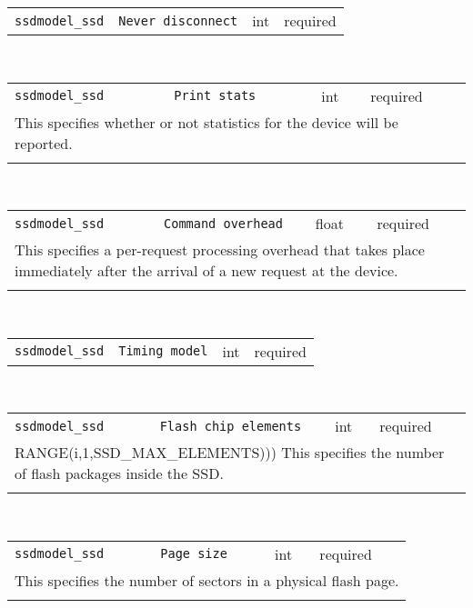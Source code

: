 \noindent 
\begin{tabular}{|p{\lpmodwidth}|p{\lpnamewidth}|p{0.5in}|p{0.5in}|}
\cline{1-4}
\texttt{ssdmodel\_ssd} & \texttt{Never disconnect} & int & required \\ 
\cline{1-4}
\end{tabular}\\ 
\noindent 
\begin{tabular}{|p{\lpmodwidth}|p{\lpnamewidth}|p{0.5in}|p{0.5in}|}
\cline{1-4}
\texttt{ssdmodel\_ssd} & \texttt{Print stats} & int & required \\ 
\cline{1-4}
\multicolumn{4}{|p{6in}|}{
This specifies whether or not statistics for the device will be reported.
}\\ 
\cline{1-4}
\multicolumn{4}{p{5in}}{}\\
\end{tabular}\\ 
\noindent 
\begin{tabular}{|p{\lpmodwidth}|p{\lpnamewidth}|p{0.5in}|p{0.5in}|}
\cline{1-4}
\texttt{ssdmodel\_ssd} & \texttt{Command overhead} & float & required \\ 
\cline{1-4}
\multicolumn{4}{|p{6in}|}{
This specifies a per-request processing overhead that takes place
immediately after the arrival of a new request at the device.
}\\ 
\cline{1-4}
\multicolumn{4}{p{5in}}{}\\
\end{tabular}\\ 
\noindent 
\begin{tabular}{|p{\lpmodwidth}|p{\lpnamewidth}|p{0.5in}|p{0.5in}|}
\cline{1-4}
\texttt{ssdmodel\_ssd} & \texttt{Timing model} & int & required \\ 
\cline{1-4}
\end{tabular}\\ 
\noindent 
\begin{tabular}{|p{\lpmodwidth}|p{\lpnamewidth}|p{0.5in}|p{0.5in}|}
\cline{1-4}
\texttt{ssdmodel\_ssd} & \texttt{Flash chip elements} & int & required \\ 
\cline{1-4}
\multicolumn{4}{|p{6in}|}{
RANGE(i,1,SSD_MAX_ELEMENTS)))
This specifies the number of flash packages inside the SSD.
}\\ 
\cline{1-4}
\multicolumn{4}{p{5in}}{}\\
\end{tabular}\\ 
\noindent 
\begin{tabular}{|p{\lpmodwidth}|p{\lpnamewidth}|p{0.5in}|p{0.5in}|}
\cline{1-4}
\texttt{ssdmodel\_ssd} & \texttt{Page size} & int & required \\ 
\cline{1-4}
\multicolumn{4}{|p{6in}|}{
This specifies the number of sectors in a physical flash page.
}\\ 
\cline{1-4}
\multicolumn{4}{p{5in}}{}\\
\end{tabular}\\ 
